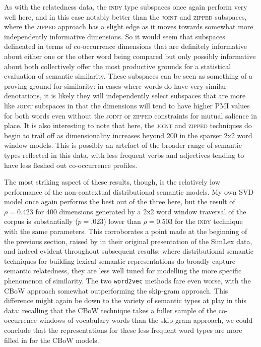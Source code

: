 As with the relatedness data, the \textsc{indy} type subspaces once again perform very well here, and in this case notably better than the \textsc{joint} and \textsc{zipped} subspaces, where the \textsc{zipped} approach has a slight edge as it moves towards somewhat more independently informative dimensions.  So it would seem that subspaces delineated in terms of co-occurrence dimensions that are definitely informative about either one or the other word being compared but only possibly informative about both collectively offer the most productive grounds for a statistical evaluation of semantic similarity.  These subspaces can be seen as something of a proving ground for similarity: in cases where words do have very similar denotations, it is likely they will independently select subspaces that are more like \textsc{joint} subspaces in that the dimensions will tend to have higher PMI values for both words even without the \textsc{joint} or \textsc{zipped} constraints for mutual salience in place.  It is also interesting to note that here, the \textsc{joint} and \textsc{zipped} techniques do begin to trail off as dimensionality increases beyond 200 in the sparser 2x2 word window models.  This is possibly an artefact of the broader range of semantic types reflected in this data, with less frequent verbs and adjectives tending to have less fleshed out co-occurrence profiles.

The most striking aspect of these results, though, is the relatively low performance of the non-contextual distributional semantic models.  My own SVD model once again performs the best out of the three here, but the result of $\rho = 0.423$ for 400 dimensions generated by a 2x2 word window traversal of the corpus is substantially ($p = .023$) lower than $\rho = 0.503$ for the \textsc{indy} technique with the same parameters.  This corroborates a point made at the beginning of the previous section, raised by \cite{HillEA2015} in their original presentation of the SimLex data, and indeed evident throughout subsequent results: where distributional semantic techniques for building lexical semantic representations do broadly capture semantic relatedness, they are less well tuned for modelling the more specific phenomenon of similarity.  The two \texttt{word2vec} methods fare even worse, with the CBoW approach somewhat outperforming the skip-gram approach.  This difference might again be down to the variety of semantic types at play in this data: recalling that the CBoW technique takes a fuller sample of the co-occurrence windows of vocabulary words than the skip-gram approach, we could conclude that the representations for these less frequent word types are more filled in for the CBoW models.

